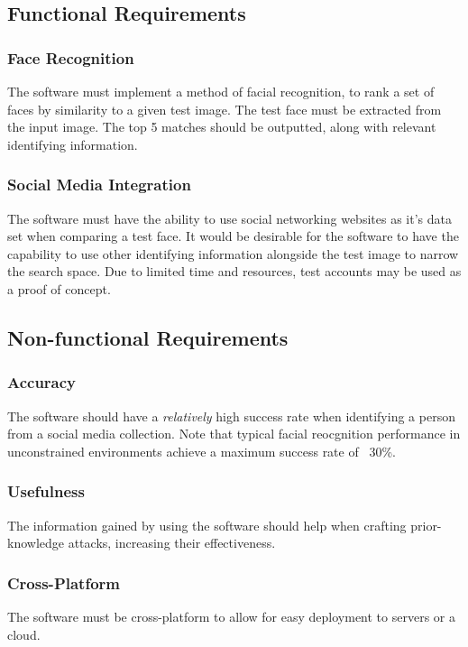 \documentclass[12pt]{article}
\begin{document}
\subsection{Functional Requirements}
\subsubsection{Face Recognition}
The software must implement a method of facial recognition, to rank a set of faces by similarity to a given test image. The test face must be extracted from the input image. The top 5 matches should be outputted, along with relevant identifying information.

\subsubsection{Social Media Integration}
The software must have the ability to use social networking websites as it's data set when comparing a test face. It would be desirable for the software to have the capability to use other identifying information alongside the test image to narrow the search space. Due to limited time and resources, test accounts may be used as a proof of concept.

\subsection{Non-functional Requirements}
\subsubsection{Accuracy}
The software should have a \textit{relatively} high success rate when identifying a person from a social media collection. Note that typical facial reocgnition performance in unconstrained environments achieve a maximum success rate of ~30\%.

\subsubsection{Usefulness}
The information gained by using the software should help when crafting prior-knowledge attacks, increasing their effectiveness.

\subsubsection{Cross-Platform}
The software must be cross-platform to allow for easy deployment to servers or a cloud.
\end{document}
